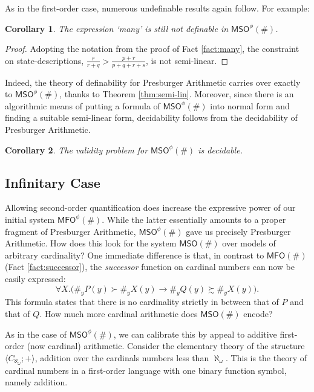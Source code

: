 \documentclass[12pt,oneside,reqno]{amsart}
\newtheorem{corollary}{Corollary}
\theoremstyle{definition}
\begin{document}
As in the first-order case, numerous undefinable results again follow. For example: 
\begin{corollary} The expression `many' is still not definable in $\mathsf{MSO}^\phi(\#)$.
\end{corollary}
\begin{proof} Adopting the notation from the proof of Fact \ref{fact:many}, the constraint on state-descriptions, $\frac{r}{r+q} > \frac{p+r}{p+q+r+s}$, is not semi-linear. 
\end{proof}

Indeed, the theory of definability for Presburger Arithmetic carries over exactly to $\mathsf{MSO}^\phi(\#)$, thanks to Theorem \ref{thm:semi-lin}. Moreover, since there is an algorithmic means of putting a formula of $\mathsf{MSO}^\phi(\#)$ into normal form and finding a suitable semi-linear form, decidability follows from the decidability of Presburger Arithmetic.
\begin{corollary} The validity problem for $\mathsf{MSO}^\phi(\#)$ is decidable. 
\end{corollary}



\subsection{Infinitary Case} \label{section:soinf} Allowing second-order quantification does increase the expressive power of our initial system $\mathsf{MFO}^\phi(\#)$. While the latter essentially amounts to a proper fragment of Presburger Arithmetic, $\mathsf{MSO}^\phi(\#)$ gave us precisely Presburger Arithmetic. How does this look for the system $\mathsf{MSO}(\#)$ over models of arbitrary cardinality? One immediate difference is that, in contrast to $\mathsf{MFO}(\#)$ (Fact \ref{fact:successor}), the \emph{successor} function on cardinal numbers can now be easily expressed: $$\forall X.\big( \#_yP(y) \succ \#_y X(y) \rightarrow \#_y Q(y) \succsim \#_yX(y)\big).$$ This formula states that there is no cardinality strictly in between that of $P$ and that of $Q$. How much more cardinal arithmetic does $\mathsf{MSO}(\#)$ encode? 

As in the case of $\mathsf{MSO}^\phi(\#)$, we can calibrate this by appeal to additive first-order (now cardinal) arithmetic. Consider the elementary theory of the structure $\langle C_{\aleph_\omega};+ \rangle$, addition over the cardinals numbers less than $\aleph_\omega$. This is the theory of cardinal numbers in a first-order language with one binary function symbol, namely addition. 
\end{document}
